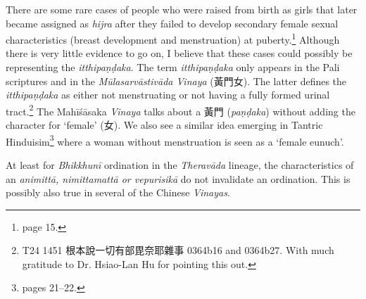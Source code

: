 There are some rare cases of people who were raised from birth as girls that later became assigned as \textit{hijra} after they failed to develop secondary female sexual characteristics (breast development and menstruation) at puberty.\footnote{\cite{nanda} page 15.} Although there is very little evidence to go on, I believe that these cases could possibly be representing the \textit{itthipaṇḍaka}. The term \textit{itthipaṇḍaka} only appears in the Pali scriptures and in the \textit{Mūlasarvāstivāda Vinaya} (黃門女). The latter defines the \textit{itthipaṇḍaka} as either not menstruating or not having a fully formed urinal tract.\footnote{T24 1451 根本說一切有部毘奈耶雜事 0364b16 and 0364b27. With much gratitude to Dr. Hsiao-Lan Hu for pointing this out.} The Mahīśāsaka \textit{Vinaya} talks about a 黃門 (\textit{paṇḍaka}) without adding the character for `female' (女). We also see a similar idea emerging in Tantric Hinduisim\footnote{\cite{nanda} pages 21–22.} where a woman without menstruation is seen as a `female eunuch'.

At least for \textit{Bhikkhunī} ordination in the \textit{Theravāda} lineage, the characteristics of an \textit{animittā, nimittamattā or vepurisikā} do not invalidate an ordination. This is possibly also true in several of the Chinese \textit{Vinayas}.
